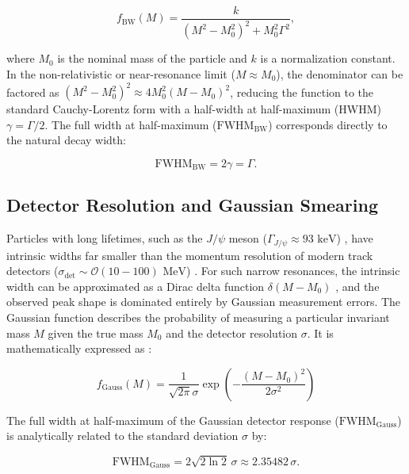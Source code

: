 \documentclass[11pt, a4paper]{article}
\numberwithin{equation}{section}
\begin{document}
\begin{equation} f_{\text{BW}}(M) = \frac{k}{(M^2 - M_0^2)^2 + M_0^2 \Gamma^2}, \end{equation}

where $M_0$ is the nominal mass of the particle and $k$ is a normalization constant. In the non-relativistic or near-resonance limit ($M \approx M_0$), the denominator can be factored as $(M^2 - M_0^2)^2 \approx 4 M_0^2 (M - M_0)^2$, reducing the function to the standard Cauchy-Lorentz form with a half-width at half-maximum (HWHM) $\gamma = \Gamma/2$. The full width at half-maximum ($\text{FWHM}_{\text{BW}}$) corresponds directly to the natural decay width:

\begin{equation} \text{FWHM}_{\text{BW}} = 2\gamma = \Gamma. \end{equation}

\subsection{Detector Resolution and Gaussian Smearing}

Particles with long lifetimes, such as the $J/\psi$ meson ($\Gamma_{J/\psi} \approx 93\text{ keV}$) \cite{pdgtakahashijpsi2026review}, have intrinsic widths far smaller than the momentum resolution of modern track detectors ($\sigma_{\text{det}} \sim \mathcal{O}(10 - 100)\text{ MeV}$) \cite{salvucci2012muonres}. For such narrow resonances, the intrinsic width can be approximated as a Dirac delta function $\delta(M - M_0)$ \cite{cowan1998statistical}, and the observed peak shape is dominated entirely by Gaussian measurement errors. The Gaussian function describes the probability of measuring a particular invariant mass $M$ given the true mass $M_0$ and the detector resolution $\sigma$. It is mathematically expressed as \cite{squires2001statistics}:

\begin{equation} f_{\text{Gauss}}(M) = \frac{1}{\sqrt{2\pi}\sigma} \exp\left( -\frac{(M - M_0)^2}{2\sigma^2} \right) \end{equation}

The full width at half-maximum of the Gaussian detector response ($\text{FWHM}_{\text{Gauss}}$) is analytically related to the standard deviation $\sigma$ by:

\begin{equation} \text{FWHM}_{\text{Gauss}} = 2\sqrt{2\ln 2}\,\sigma \approx 2.35482\,\sigma. \end{equation}
\end{document}
